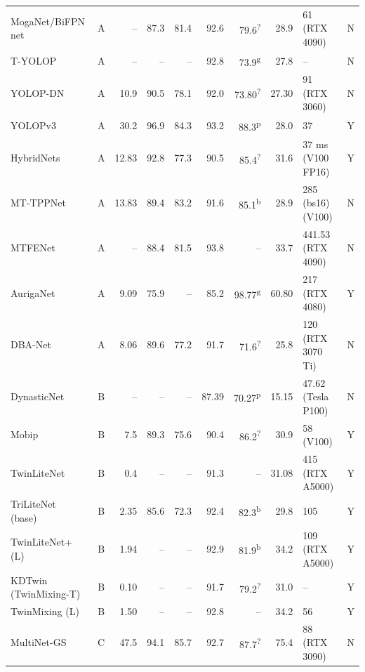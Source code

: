 \begin{table}[!htbp]
\begin{tabularx}{\linewidth}{L{3.3cm} c r r r r r r X c}
MogaNet/BiFPN net~\cite{li2024envperception} & A & -- & 87.3 & 81.4 & 92.6 & 79.6\textsuperscript{?} & 28.9 & 61 (RTX 4090) & N \\
T-YOLOP~\cite{lin2024tyolop} & A & -- & -- & -- & 92.8 & 73.9\textsuperscript{g} & 27.8 & -- & N \\
YOLOP-DN~\cite{tang2024yolopdn} & A & 10.9 & 90.5 & 78.1 & 92.0 & 73.80\textsuperscript{?} & 27.30 & 91 (RTX 3060) & N \\
YOLOPv3~\cite{zhan2024yolopv3} & A & 30.2 & 96.9 & 84.3 & 93.2 & 88.3\textsuperscript{p} & 28.0 & 37 & Y \\
HybridNets~\cite{vu2025hybridnets} & A & 12.83 & 92.8 & 77.3 & 90.5 & 85.4\textsuperscript{?} & 31.6 & 37 ms (V100 FP16) & Y \\
MT-TPPNet~\cite{mttppnet2025} & A & 13.83 & 89.4 & 83.2 & 91.6 & 85.1\textsuperscript{b} & 28.9 & 285 (bs16) (V100) & N \\
MTFENet~\cite{mtfenet2025} & A & -- & 88.4 & 81.5 & 93.8 & -- & 33.7 & 441.53 (RTX 4090) & N \\
AurigaNet~\cite{ghasemzadeh2026auriganet} & A & 9.09 & 75.9 & -- & 85.2 & 98.77\textsuperscript{g} & 60.80 & 217 (RTX 4080) & Y \\
DBA-Net~\cite{dbanet2026} & A & 8.06 & 89.6 & 77.2 & 91.7 & 71.6\textsuperscript{?} & 25.8 & 120 (RTX 3070 Ti) & N \\
DynasticNet~\cite{caldiran2022dynasticnet} & B & -- & -- & -- & 87.39 & 70.27\textsuperscript{p} & 15.15 & 47.62 (Tesla P100) & N \\
Mobip~\cite{ye2023mobip} & B & 7.5 & 89.3 & 75.6 & 90.4 & 86.2\textsuperscript{?} & 30.9 & 58 (V100) & Y \\
TwinLiteNet~\cite{che2023twinlitenet} & B & 0.4 & -- & -- & 91.3 & -- & 31.08 & 415 (RTX A5000) & Y \\
TriLiteNet (base)~\cite{trilitenet2025} & B & 2.35 & 85.6 & 72.3 & 92.4 & 82.3\textsuperscript{b} & 29.8 & 105 & Y \\
TwinLiteNet+ (L)~\cite{che2025twinliteplus} & B & 1.94 & -- & -- & 92.9 & 81.9\textsuperscript{b} & 34.2 & 109 (RTX A5000) & Y \\
KDTwin (TwinMixing-T)~\cite{kdtwin2026} & B & 0.10 & -- & -- & 91.7 & 79.2\textsuperscript{?} & 31.0 & -- & Y \\
TwinMixing (L)~\cite{twinmixing2026} & B & 1.50 & -- & -- & 92.8 & -- & 34.2 & 56 & Y \\
MultiNet-GS~\cite{li2023multinetgs} & C & 47.5 & 94.1 & 85.7 & 92.7 & 87.7\textsuperscript{?} & 75.4 & 88 (RTX 3090) & N \\

\end{tabularx}
\end{table}
